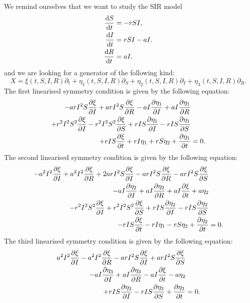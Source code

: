 We remind ourselves that we want to study the SIR model
\begin{equation*}
  \begin{split}
    \dv{S}{t}&=-rSI,\\
    \dv{I}{t}&=rSI-aI.\\
    \dv{R}{t}&=aI.\\    
    \end{split}
  \end{equation*}
  and we are looking for a generator of the following kind:
\begin{equation}
X=\xi(t,S,I,R)\partial_t+\eta_1(t,S,I,R)\partial_S+\eta_2(t,S,I,R)\partial_I+\eta_3(t,S,I,R)\partial_R.
\end{equation}
The first linearised symmetry condition is given by the following equation:
\begin{align}
  - a r I^{2} S \pdv{\xi}{I} + a r I^{2} S \pdv{\xi}{R} - a I \pdv{\eta_1}{I} + a I \pdv{\eta_1}{R}&\nonumber\\
  + r^{2} I^{2} S^{2} \pdv{\xi}{I} - r^{2} I^{2} S^{2} \pdv{\xi}{S} + r I S \pdv{\eta_1}{I} - r I S \pdv{\eta_1}{S}&\nonumber\\
  + r I S \pdv{\xi}{t} + r I\eta_1 + r S\eta_2 + \pdv{\eta_1}{t}&=0.\label{eq:SIR_lin_sym_1}
\end{align}
The second linearised symmetry condition is given by the following equation:
\begin{align}
  - a^{2} I^{2} \pdv{\xi}{I} + a^{2} I^{2} \pdv{\xi}{R} + 2 a r I^{2} S \pdv{\xi}{I} - a r I^{2} S \pdv{\xi}{R} - a r I^{2} S \pdv{\xi}{S}&\nonumber\\
  - a I \pdv{\eta_2}{I} + a I \pdv{\eta_2}{R} + a I \pdv{\xi}{t} + a\eta_2&\nonumber\\
  - r^{2} I^{2} S^{2} \pdv{\xi}{I} + r^{2} I^{2} S^{2} \pdv{\xi}{S} + r I S \pdv{\eta_2}{I} - r I S \pdv{\eta_2}{S}&\nonumber\\
  - r I S \pdv{\xi}{t} - r I\eta_1 - r S\eta_2 + \pdv{\eta_2}{t}&=0.\label{eq:SIR_lin_sym_2}
\end{align}
The third linearised symmetry condition is given by the following equation:
\begin{align}
  a^{2} I^{2} \pdv{\xi}{I} - a^{2} I^{2} \pdv{\xi}{R} - a r I^{2} S \pdv{\xi}{I} + a r I^{2} S \pdv{\xi}{S}&\nonumber\\
  - a I \pdv{\eta_3}{I} + a I \pdv{\eta_3}{R} - a I \pdv{\xi}{t} - a\eta_2&\nonumber\\
  + r I S \pdv{\eta_3}{I} - r I S \pdv{\eta_3}{S} + \pdv{\eta_3}{t}&=0.\label{eq:SIR_lin_sym_3}
\end{align}
